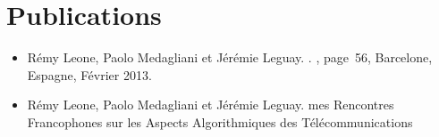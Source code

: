 \section*{Publications}

\begin{itemize}
  \item Rémy Leone, Paolo Medagliani et Jérémie Leguay.
    .
    , page~56, Barcelone, Espagne, Février 2013.

  \item Rémy Leone, Paolo Medagliani et Jérémie Leguay.
    mes Rencontres Francophones sur les Aspects Algorithmiques des T{\'e}l{\'e}communications

\end{itemize}